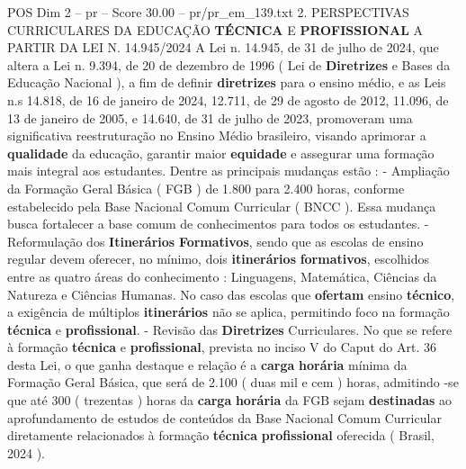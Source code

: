 \begin{textsample}{POS Dim 2 – pr – Score 30.00 – pr/pr\_em\_139.txt}  \label{ex:f2_pos_113}
2.
PERSPECTIVAS CURRICULARES DA EDUCAÇÃO \textbf{TÉCNICA} E \textbf{PROFISSIONAL} A PARTIR DA LEI N. 14.945/2024 A Lei n. 14.945, de 31 de julho de 2024, que altera a Lei n. 9.394, de 20 de dezembro de 1996 ( Lei de \textbf{Diretrizes} e Bases da Educação Nacional ), a fim de definir \textbf{diretrizes} para o ensino médio, e as Leis n.s 14.818, de 16 de janeiro de 2024, 12.711, de 29 de agosto de 2012, 11.096, de 13 de janeiro de 2005, e 14.640, de 31 de julho de 2023, promoveram uma significativa reestruturação no Ensino Médio brasileiro, visando aprimorar a \textbf{qualidade} da educação, garantir maior \textbf{equidade} e assegurar uma formação mais integral aos estudantes.
Dentre as principais mudanças estão : - Ampliação da Formação Geral Básica ( FGB ) de 1.800 para 2.400 horas, conforme estabelecido pela Base Nacional Comum Curricular ( BNCC ).
Essa mudança busca fortalecer a base comum de conhecimentos para todos os estudantes. - Reformulação dos \textbf{Itinerários} \textbf{Formativos}, sendo que as escolas de ensino regular devem oferecer, no mínimo, dois \textbf{itinerários} \textbf{formativos}, escolhidos entre as quatro áreas do conhecimento : Linguagens, Matemática, Ciências da Natureza e Ciências Humanas.
No caso das escolas que \textbf{ofertam} ensino \textbf{técnico}, a exigência de múltiplos \textbf{itinerários} não se aplica, permitindo foco na formação \textbf{técnica} e \textbf{profissional}. - Revisão das \textbf{Diretrizes} Curriculares.
No que se refere à formação \textbf{técnica} e \textbf{profissional}, prevista no inciso V do Caput do Art. 36 desta Lei, o que ganha destaque e relação é a \textbf{carga} \textbf{horária} mínima da Formação Geral Básica, que será de 2.100 ( duas mil e cem ) horas, admitindo -se que até 300 ( trezentas ) horas da \textbf{carga} \textbf{horária} da FGB sejam \textbf{destinadas} ao aprofundamento de estudos de conteúdos da Base Nacional Comum Curricular diretamente relacionados à formação \textbf{técnica} \textbf{profissional} oferecida ( Brasil, 2024 ).

\end{textsample}
